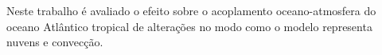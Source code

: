 
\begin{resumo}


\hypertarget{estilo:resumo}{} %


Neste trabalho é avaliado o efeito sobre o acoplamento oceano-atmosfera do oceano Atlântico tropical de alterações no modo como o modelo representa nuvens e convecção.

 
\end{resumo}